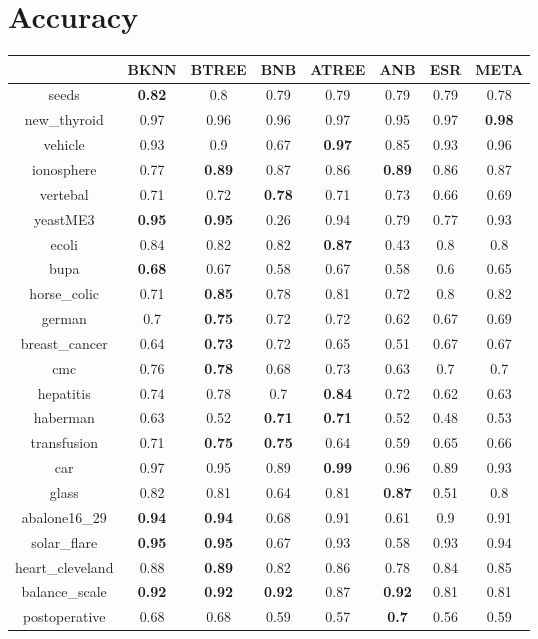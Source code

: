 \documentclass{article}%
\begin{document}
%
\normalsize%
\section*{Accuracy}%
\begin{tabular}{c|ccccccc}%
\hline%
&BKNN&BTREE&BNB&ATREE&ANB&ESR&META\\%
\hline%
seeds&\textbf{0.82}&0.8&0.79&0.79&0.79&0.79&0.78\\%
new\_thyroid&0.97&0.96&0.96&0.97&0.95&0.97&\textbf{0.98}\\%
vehicle&0.93&0.9&0.67&\textbf{0.97}&0.85&0.93&0.96\\%
ionosphere&0.77&\textbf{0.89}&0.87&0.86&\textbf{0.89}&0.86&0.87\\%
vertebal&0.71&0.72&\textbf{0.78}&0.71&0.73&0.66&0.69\\%
yeastME3&\textbf{0.95}&\textbf{0.95}&0.26&0.94&0.79&0.77&0.93\\%
ecoli&0.84&0.82&0.82&\textbf{0.87}&0.43&0.8&0.8\\%
bupa&\textbf{0.68}&0.67&0.58&0.67&0.58&0.6&0.65\\%
horse\_colic&0.71&\textbf{0.85}&0.78&0.81&0.72&0.8&0.82\\%
german&0.7&\textbf{0.75}&0.72&0.72&0.62&0.67&0.69\\%
breast\_cancer&0.64&\textbf{0.73}&0.72&0.65&0.51&0.67&0.67\\%
cmc&0.76&\textbf{0.78}&0.68&0.73&0.63&0.7&0.7\\%
hepatitis&0.74&0.78&0.7&\textbf{0.84}&0.72&0.62&0.63\\%
haberman&0.63&0.52&\textbf{0.71}&\textbf{0.71}&0.52&0.48&0.53\\%
transfusion&0.71&\textbf{0.75}&\textbf{0.75}&0.64&0.59&0.65&0.66\\%
car&0.97&0.95&0.89&\textbf{0.99}&0.96&0.89&0.93\\%
glass&0.82&0.81&0.64&0.81&\textbf{0.87}&0.51&0.8\\%
abalone16\_29&\textbf{0.94}&\textbf{0.94}&0.68&0.91&0.61&0.9&0.91\\%
solar\_flare&\textbf{0.95}&\textbf{0.95}&0.67&0.93&0.58&0.93&0.94\\%
heart\_cleveland&0.88&\textbf{0.89}&0.82&0.86&0.78&0.84&0.85\\%
balance\_scale&\textbf{0.92}&\textbf{0.92}&\textbf{0.92}&0.87&\textbf{0.92}&0.81&0.81\\%
postoperative&0.68&0.68&0.59&0.57&\textbf{0.7}&0.56&0.59\\%
\end{tabular}
\end{document}

